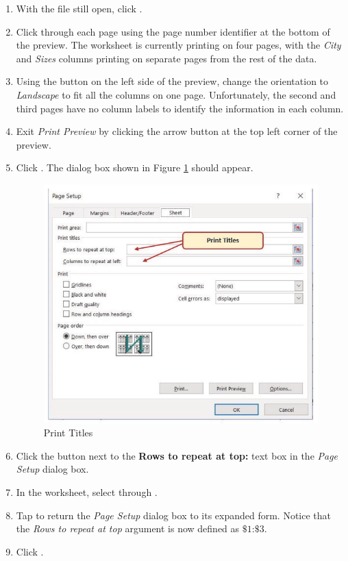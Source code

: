 \begin{enumbox}
	\begin{enumerate}
		\item With the  file still open, click .
		\item Click through each page using the page number identifier at the bottom of the preview. The worksheet is currently printing on four pages, with the \textit{City} and \textit{Sizes} columns printing on separate pages from the rest of the data.
		\item Using the  button on the left side of the preview, change the orientation to \textit{Landscape} to fit all the columns on one page. Unfortunately, the second and third pages have no column labels to identify the information in each column. 
		\item Exit \textit{Print Preview} by clicking the arrow button at the top left corner of the preview.
		\item Click . The dialog box shown in Figure \ref{03:fig29} should appear.
	
		\begin{figure}[H]
			\centering
			\includegraphics[width=\maxwidth{.95\linewidth}]{gfx/ch03_fig29}
			\caption{Print Titles}
			\label{03:fig29}
		\end{figure}

		\item Click the  button next to the \textbf{Rows to repeat at top:} text box in the \textit{Page Setup} dialog box.
		\item In the worksheet, select   through .
		\item Tap  to return the \textit{Page Setup} dialog box to its expanded form. Notice that the \textit{Rows to repeat at top} argument is now defined as $ \$1 $:$ \$3 $.
		\item Click .
	\end{enumerate}
\end{enumbox}

